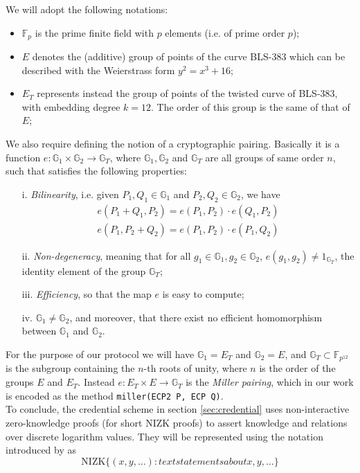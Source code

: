 \documentclass[twocolumn]{article}
\begin{document}
We will adopt the following notations:
\begin{itemize}
    \item $\mathbb{F}_p$ is the prime finite field with $p$ elements (i.e. of prime order $p$); %
    \item $E$ denotes the (additive) group of points of the curve BLS-383 \citep{bls383} which can be described with the Weierstrass form  $y^2=x^3 + 16$; 
    \item $E_T$ represents instead the group of points of the twisted curve of BLS-383, with embedding degree $k=12$. The order of this group is the same of that of $E$;
\end{itemize}
We also require defining the notion of a cryptographic pairing. Basically it is a function $e: \mathbb{G}_1\times\mathbb{G}_2\to \mathbb{G}_T$, where $\mathbb{G}_1,\mathbb{G}_2$ and $\mathbb{G}_T$ are all groups of same order $n$, such that satisfies the following properties:
\begin{itemize}
    \item [i.] \emph{Bilinearity}, i.e. given $P_1,Q_1\in\mathbb{G}_1$ and $P_2,Q_2\in\mathbb{G}_2$, we have 
    \begin{align*}
        e(P_1+Q_1,P_2) = e(P_1,P_2)\cdot e(Q_1,P_2) \\
        e(P_1,P_2+Q_2) = e(P_1,P_2)\cdot e(P_1,Q_2)
    \end{align*}
    \item[ii.] \emph{Non-degeneracy}, meaning that for all $g_1\in\mathbb{G}_1, g_2\in\mathbb{G}_2$, $e(g_1,g_2)\ne 1_{\mathbb{G}_T}$, the identity element of the group $\mathbb{G}_T$;
    \item[iii.] \emph{ Efficiency}, so that the map $e$ is easy to compute;
    \item[iv. ] $\mathbb{G}_1\ne \mathbb{G}_2$, and moreover, that there exist no efficient homomorphism between $\mathbb{G}_1$ and $\mathbb{G}_2$.
\end{itemize}
For the purpose of our protocol we will have $\mathbb{G}_1 = E_T$ and $\mathbb{G}_2 = E$, and $\mathbb{G}_T\subset \mathbb{F}_{p^{12}}$ is the subgroup containing the $n$-th roots of unity, where $n$ is the order of the groups $E$ and $E_T$. Instead $e: E_T  \times E\to \mathbb{G}_T$ is the \emph{Miller pairing}, which in our work is encoded as the method \verb!miller(ECP2 P, ECP Q)!. \\
To conclude, the credential scheme in section \ref{sec:credential} uses non-interactive zero-knowledge proofs (for short NIZK proofs) to assert knowledge and relations over discrete logarithm values. They will be represented using the notation introduced by \cite{camenisch} as 
\[
\text{NIZK}\{(x,y,\dots): text{statements about x, y,}\dots \}
\]
\end{document}
